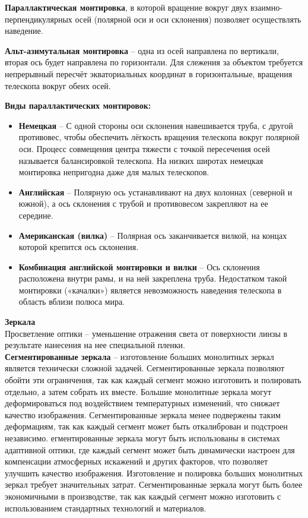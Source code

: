 \documentclass[12pt]{article}
\begin{document}
	\textbf{Параллактическая монтировка}, в которой вращение
	вокруг двух взаимно-перпендикулярных осей (полярной
	оси и оси склонения) позволяет осуществлять наведение.
	
	\textbf{Альт-азимутальная монтировка} -- одна из осей
	направлена по вертикали, вторая ось будет направлена
	по горизонтали. Для слежения за объектом требуется непрерывный пересчёт экваториальных
	координат в горизонтальные, вращения телескопа вокруг обеих осей.
	
	\textbf{Виды параллактических монтировок:}
	\begin{itemize}
		\item \textbf{Немецкая} -- С одной стороны оси склонения навешивается труба, с другой противовес,  чтобы обеспечить лёгкость вращения телескопа вокруг полярной оси. Процесс совмещения центра тяжести с точкой пересечения осей называется балансировкой телескопа. На низких широтах немецкая монтировка
		непригодна даже для малых телескопов.
		\item \textbf{Английская} -- Полярную ось устанавливают на двух колоннах (северной и южной), а ось склонения с	трубой и противовесом закрепляют на ее середине.
		\item \textbf{Американская (вилка)} -- Полярная ось	заканчивается вилкой, на концах	которой крепится
		ось склонения.
		\item \textbf{Комбинация английской монтировки и вилки} -- Ось склонения расположена внутри рамы, и
		на ней закреплена труба. Недостатком такой монтировки («качалки») является невозможность наведения	телескопа в область вблизи полюса мира.
	\end{itemize}
	
	\textbf{Зеркала}\\
	Просветление оптики -- уменьшение отражения света от поверхности линзы в результате нанесения на нее специальной пленки.\\
	\textbf{Сегментированные зеркала} -- изготовление больших монолитных зеркал является технически сложной задачей. Сегментированные зеркала позволяют обойти эти ограничения, так как каждый сегмент можно изготовить и полировать отдельно, а затем собрать их вместе. Большие монолитные зеркала могут деформироваться под воздействием температурных изменений, что снижает качество изображения. Сегментированные зеркала менее подвержены таким деформациям, так как каждый сегмент может быть откалиброван и подстроен независимо. егментированные зеркала могут быть использованы в системах адаптивной оптики, где каждый сегмент может быть динамически настроен для компенсации атмосферных искажений и других факторов, что позволяет улучшить качество изображения. Изготовление и полировка больших монолитных зеркал требует значительных затрат. Сегментированные зеркала могут быть более экономичными в производстве, так как каждый сегмент можно изготовить с использованием стандартных технологий и материалов.
	
\end{document}
